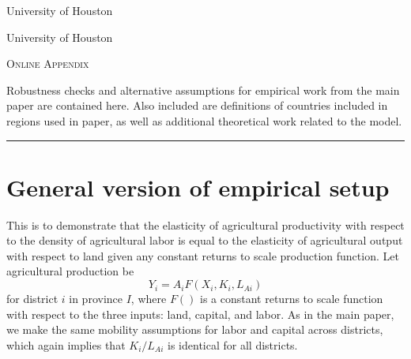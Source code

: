 \documentclass[11pt]{article}
\begin{document}
\begin{titlepage}
\vspace{2in} \noindent {\large \today}

\vspace{.5in} 

\vspace{.25in} 

\vspace{.05in} \noindent University of Houston

\vspace{.25in} 

\vspace{.05in} \noindent University of Houston

\vspace{2in} \noindent \textsc{Online Appendix} \hrulefill

\vspace{.05in} \noindent Robustness checks and alternative assumptions for empirical work from the main paper are contained here. Also included are definitions of countries included in regions used in paper, as well as additional theoretical work related to the model.
\vspace{.1in} \hrule

\end{titlepage}

\pagebreak 

\tableofcontents

\section{General version of empirical setup}
This is to demonstrate that the elasticity of agricultural productivity with respect to the density of agricultural labor is equal to the elasticity of agricultural output with respect to land given any constant returns to scale production function. Let agricultural production be
\begin{equation}
    Y_i = A_i F(X_i,K_i,L_{Ai}) 
\end{equation}
for district $i$ in province $I$, where $F()$ is a constant returns to scale function with respect to the three inputs: land, capital, and labor. As in the main paper, we make the same mobility assumptions for labor and capital across districts, which again implies that $K_i/L_{Ai}$ is identical for all districts. 
\end{document}
